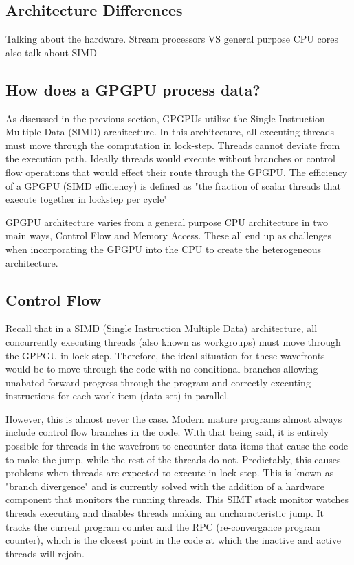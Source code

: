\subsection*{Architecture Differences}

Talking about the hardware. Stream processors VS general purpose CPU cores also talk about SIMD

\subsection*{How does a GPGPU process data?}

As discussed in the previous section, GPGPUs utilize the Single Instruction Multiple Data (SIMD) architecture. In this architecture, all executing threads must move through the computation in lock-step. Threads cannot deviate from the execution path. Ideally threads would execute without branches or control flow operations that would effect their route through the GPGPU. The efficiency of a GPGPU (SIMD efficiency) is defined as "the fraction of scalar threads that execute together in lockstep per cycle" \cite{memcached}

GPGPU architecture varies from a general purpose CPU architecture in two main ways, Control Flow and Memory Access. These all end up as challenges when incorporating the GPGPU into the CPU to create the heterogeneous architecture. 

\subsection*{Control Flow}

Recall that in a SIMD (Single Instruction Multiple Data) architecture, all concurrently executing threads (also known as workgroups) must move through the GPPGU in lock-step. Therefore, the ideal situation for these wavefronts would be to move through the code with no conditional branches allowing unabated forward progress through the program and correctly executing instructions for each work item (data set) in parallel. 

However, this is almost never the case. Modern mature programs almost always include control flow branches in the code. With that being said, it is entirely possible for threads in the wavefront to encounter data items that cause the code to make the jump, while the rest of the threads do not. Predictably, this causes problems when threads are expected to execute in lock step. This is known as "branch divergence" and is currently solved with the addition of a hardware component that monitors the running threads. This SIMT stack monitor watches threads executing and disables threads making an uncharacteristic jump. It tracks the current program counter and the RPC (re-convergance program counter), which is the closest point in the code at which the inactive and active threads will rejoin. 

